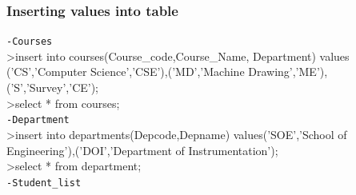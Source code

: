 \documentclass{article}
\begin{document}
\newpage
\begin{flushleft}
\subsubsection{Inserting values into table}
\texttt{-Courses}\\
\vspace{0.1in}\hspace{0.3in}\textgreater insert into courses(Course\_code,Course\_Name, Department) values \\ \vspace{0.1in}\hspace{0.4in} ('CS','Computer Science','CSE'),('MD','Machine Drawing','ME'),\\\vspace{0.1in}\hspace{0.4in}('S','Survey','CE');\\
\vspace{0.1in}\hspace{0.4in}\textgreater select * from courses;\\
\texttt{-Department}\\
\vspace{0.1in}\hspace{0.3in}\textgreater insert into departments(Depcode,Depname) values('SOE','School of \\ \vspace{0.1in}\hspace{0.4in} Engineering'),('DOI','Department of Instrumentation');\\
\vspace{0.1in}\hspace{0.4in}\textgreater select * from department;\\
\texttt{-Student\_list}\\

\end{flushleft}
\end{document}
